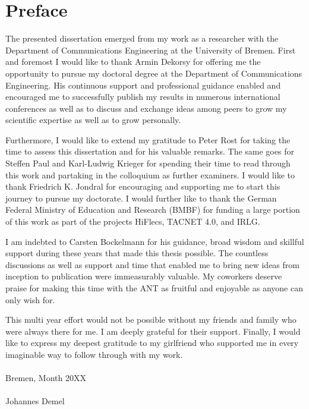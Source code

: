 \chapter*{Preface}
The presented dissertation emerged from my work as a researcher with the Department of Communications Engineering at the University of Bremen.
First and foremost I would like to thank Armin Dekorsy for offering me the opportunity to pursue my doctoral degree at the Department of Communications Engineering.
His continuous support and professional guidance enabled and encouraged me to successfully publish my results in numerous international conferences as well as to discuss and exchange ideas among peers to grow my scientific expertise as well as to grow personally.

Furthermore, I would like to extend my gratitude to Peter Rost for taking the time to assess this dissertation and for his valuable remarks.
The same goes for Steffen Paul and Karl-Ludwig Krieger for spending their time to read through this work and partaking in the colloquium as further examiners.
I would like to thank Friedrich K. Jondral for encouraging and supporting me to start this journey to pursue my doctorate.
I would further like to thank the German Federal Ministry of Education and Research (BMBF) for funding
a large portion of this work as part of the projects HiFlecs, TACNET 4.0, and IRLG.

I am indebted to Carsten Bockelmann for his guidance, broad wisdom and skillful support during these years that made this thesis possible.
The countless discussions as well as support and time that enabled me to bring new ideas from inception to publication were immeasurably valuable.
My coworkers deserve praise for making this time with the ANT as fruitful and enjoyable as anyone can only wish for.

This multi year effort would not be possible without my friends and family who were always there for me.
I am deeply grateful for their support.
Finally, I would like to express my deepest gratitude to my girlfriend who supported me in every imaginable way to follow through with my work.
\\~\\
Bremen, Month 20XX\\
\\
Johannes Demel

